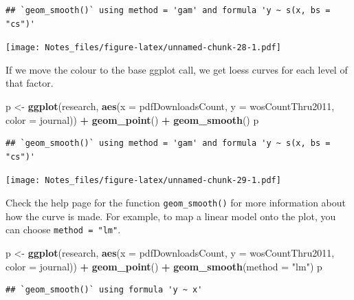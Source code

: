 \documentclass[
]{book}
\newenvironment{Shaded}{\begin{snugshade}}{\end{snugshade}}
\newcommand{\DataTypeTok}[1]{\textcolor[rgb]{0.13,0.29,0.53}{#1}}
\newcommand{\KeywordTok}[1]{\textcolor[rgb]{0.13,0.29,0.53}{\textbf{#1}}}
\newcommand{\NormalTok}[1]{#1}
\newcommand{\OperatorTok}[1]{\textcolor[rgb]{0.81,0.36,0.00}{\textbf{#1}}}
\newcommand{\StringTok}[1]{\textcolor[rgb]{0.31,0.60,0.02}{#1}}
\begin{document}
\begin{verbatim}
## `geom_smooth()` using method = 'gam' and formula 'y ~ s(x, bs = "cs")'
\end{verbatim}

\texttt{[image: Notes\_files/figure-latex/unnamed-chunk-28-1.pdf]}

If we move the colour to the base ggplot call, we get loess curves for each level of that factor.

\begin{Shaded}
\begin{Highlighting}[]
\NormalTok{p <-}\StringTok{ }\KeywordTok{ggplot}\NormalTok{(research, }\KeywordTok{aes}\NormalTok{(}\DataTypeTok{x =}\NormalTok{ pdfDownloadsCount, }
                          \DataTypeTok{y =}\NormalTok{ wosCountThru2011, }
                          \DataTypeTok{color =}\NormalTok{ journal)) }\OperatorTok{+}\StringTok{ }
\StringTok{  }\KeywordTok{geom_point}\NormalTok{() }\OperatorTok{+}\StringTok{ }
\StringTok{  }\KeywordTok{geom_smooth}\NormalTok{()}
\NormalTok{p}
\end{Highlighting}
\end{Shaded}

\begin{verbatim}
## `geom_smooth()` using method = 'gam' and formula 'y ~ s(x, bs = "cs")'
\end{verbatim}

\texttt{[image: Notes\_files/figure-latex/unnamed-chunk-29-1.pdf]}

Check the help page for the function \texttt{geom\_smooth()} for more information about how the curve is made. For example, to map a linear model onto the plot, you can choose \texttt{method\ =\ "lm"}.

\begin{Shaded}
\begin{Highlighting}[]
\NormalTok{p <-}\StringTok{ }\KeywordTok{ggplot}\NormalTok{(research, }\KeywordTok{aes}\NormalTok{(}\DataTypeTok{x =}\NormalTok{ pdfDownloadsCount, }
                          \DataTypeTok{y =}\NormalTok{ wosCountThru2011, }
                          \DataTypeTok{color =}\NormalTok{ journal)) }\OperatorTok{+}\StringTok{ }
\StringTok{  }\KeywordTok{geom_point}\NormalTok{() }\OperatorTok{+}\StringTok{ }
\StringTok{  }\KeywordTok{geom_smooth}\NormalTok{(}\DataTypeTok{method =} \StringTok{"lm"}\NormalTok{)}
\NormalTok{p}
\end{Highlighting}
\end{Shaded}

\begin{verbatim}
## `geom_smooth()` using formula 'y ~ x'
\end{verbatim}
\end{document}
